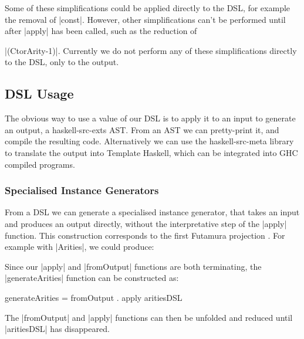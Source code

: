 \documentclass[preprint,draft]{sigplanconf}
\begin{document}
Some of these simplifications could be applied directly to the DSL, for example the removal of |const|. However, other simplifications can't be performed until after |apply| has been called, such as the reduction of \ignore|(CtorArity-1)|. Currently we do not perform any of these simplifications directly to the DSL, only to the output.

\subsection{DSL Usage}

The obvious way to use a value of our DSL is to apply it to an input to generate an output, a haskell-src-exts AST. From an AST we can pretty-print it, and compile the resulting code. Alternatively we can use the haskell-src-meta library \cite{haskell_src_meta} to translate the output into Template Haskell, which can be integrated into GHC compiled programs.

\subsubsection{Specialised Instance Generators}

From a DSL we can generate a specialised instance generator, that takes an input and produces an output directly, without the interpretative step of the |apply| function. This construction corresponds to the first Futamura projection \cite{futanama:projections}. For example with |Arities|, we could produce:


Since our |apply| and |fromOutput| functions are both terminating, the |generateArities| function can be constructed as:

\begin{code}
generateArities = fromOutput . apply aritiesDSL
\end{code}

The |fromOutput| and |apply| functions can then be unfolded and reduced until |aritiesDSL| has disappeared.
\end{document}
